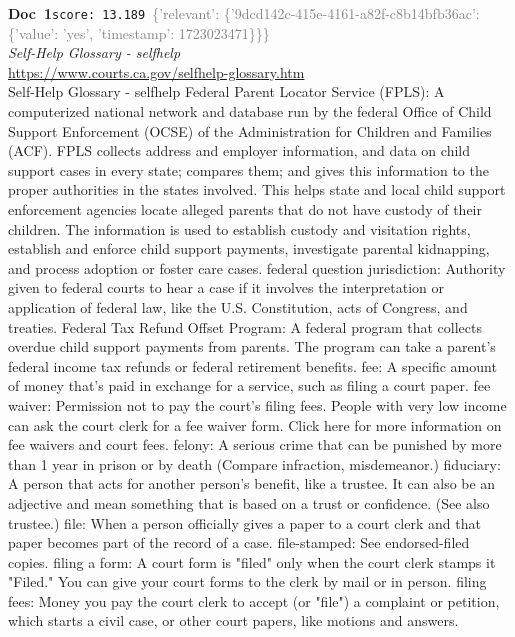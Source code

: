 \documentclass[a4paper,11pt]{article}
\begin{document}
\begin{docenv}
{\footnotesize\textcolor{doccolor}{\textbf{Doc~1}}}\hfill{\tiny\texttt{score:~13.189}}\ {\tiny\textcolor{gray}{\{'relevant': \{'9dcd142c-415e-4161-a82f-c8b14bfb36ac': \{'value': 'yes', 'timestamp': 1723023471\}\}\}}}\\[3pt]
{\small\textit{Self-Help Glossary - selfhelp}}\\[2pt]
{\tiny\url{https://www.courts.ca.gov/selfhelp-glossary.htm}}\\[4pt]
{\footnotesize Self-Help Glossary - selfhelp
Federal Parent Locator Service (FPLS): A computerized national network and database run by the federal Office of Child Support Enforcement (OCSE) of the Administration for Children and Families (ACF). FPLS collects address and employer information, and data on child support cases in every state; compares them; and gives this information to the proper authorities in the states involved. This helps state and local child support enforcement agencies locate alleged parents that do not have custody of their children. The information is used to establish custody and visitation rights, establish and enforce child support payments, investigate parental kidnapping, and process adoption or foster care cases.
federal question jurisdiction: Authority given to federal courts to hear a case if it involves the interpretation or application of federal law, like the U.S. Constitution, acts of Congress, and treaties.
Federal Tax Refund Offset Program: A federal program that collects overdue child support payments from parents. The program can take a parent's federal income tax refunds or federal retirement benefits.
fee: A specific amount of money that's paid in exchange for a service, such as filing a court paper.
fee waiver: Permission not to pay the court's filing fees. People with very low income can ask the court clerk for a fee waiver form. Click here for more information on fee waivers and court fees.
felony: A serious crime that can be punished by more than 1 year in prison or by death (Compare infraction, misdemeanor.)
fiduciary: A person that acts for another person's benefit, like a trustee. It can also be an adjective and mean something that is based on a trust or confidence. (See also trustee.)
file: When a person officially gives a paper to a court clerk and that paper becomes part of the record of a case.
file-stamped: See endorsed-filed copies.
filing a form: A court form is "filed" only when the court clerk stamps it "Filed." You can give your court forms to the clerk by mail or in person.
filing fees: Money you pay the court clerk to accept (or "file") a complaint or petition, which starts a civil case, or other court papers, like motions and answers.}
\end{docenv}
\end{document}
